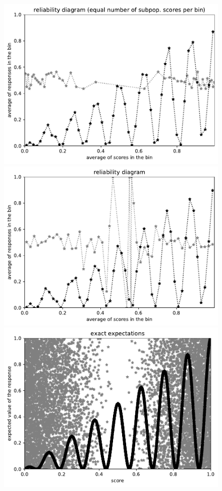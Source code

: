 \documentclass{article}
\newlength{\vertsep}
\newlength{\imsize}
\begin{document}
\begin{figure}
\begin{centering}
\parbox{\imsize}{\includegraphics[width=\imsize]
{../codes/unweighted/10000_7000_50_2/equisamps.pdf}}
\quad\quad
\parbox{\imsize}{\includegraphics[width=\imsize]
{../codes/unweighted/10000_7000_50_2/equiscore.pdf}}

\vspace{\vertsep}

\parbox{\imsize}{\includegraphics[width=\imsize]
{../codes/unweighted/10000_7000_10_2/exact.pdf}}


\end{centering}
\end{figure}
\end{document}
